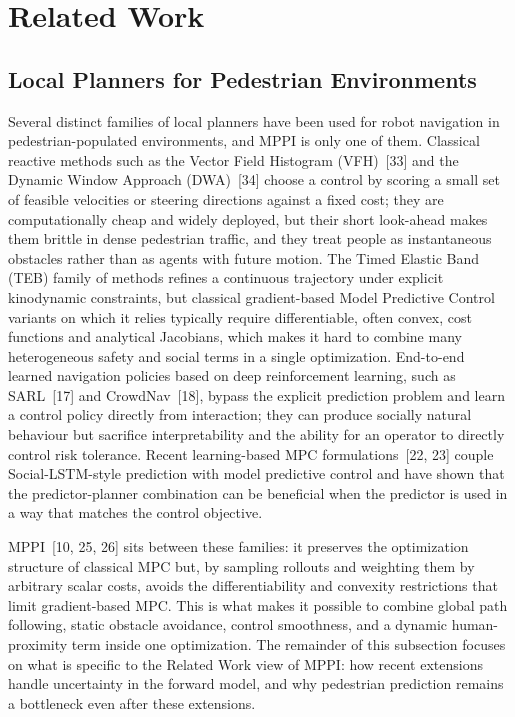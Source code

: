 \documentclass[12pt, a4paper]{article}
\begin{document}
\section{Related Work}
\label{sec:related}

\subsection{Local Planners for Pedestrian Environments}

Several distinct families of local planners have been used for robot navigation in pedestrian-populated environments, and MPPI is only one of them. Classical reactive methods such as the Vector Field Histogram (VFH)~[33] and the Dynamic Window Approach (DWA)~[34] choose a control by scoring a small set of feasible velocities or steering directions against a fixed cost; they are computationally cheap and widely deployed, but their short look-ahead makes them brittle in dense pedestrian traffic, and they treat people as instantaneous obstacles rather than as agents with future motion. The Timed Elastic Band (TEB) family of methods refines a continuous trajectory under explicit kinodynamic constraints, but classical gradient-based Model Predictive Control variants on which it relies typically require differentiable, often convex, cost functions and analytical Jacobians, which makes it hard to combine many heterogeneous safety and social terms in a single optimization. End-to-end learned navigation policies based on deep reinforcement learning, such as SARL~[17] and CrowdNav~[18], bypass the explicit prediction problem and learn a control policy directly from interaction; they can produce socially natural behaviour but sacrifice interpretability and the ability for an operator to directly control risk tolerance. Recent learning-based MPC formulations~[22, 23] couple Social-LSTM-style prediction with model predictive control and have shown that the predictor-planner combination can be beneficial when the predictor is used in a way that matches the control objective.

MPPI~[10, 25, 26] sits between these families: it preserves the optimization structure of classical MPC but, by sampling rollouts and weighting them by arbitrary scalar costs, avoids the differentiability and convexity restrictions that limit gradient-based MPC. This is what makes it possible to combine global path following, static obstacle avoidance, control smoothness, and a dynamic human-proximity term inside one optimization. The remainder of this subsection focuses on what is specific to the Related Work view of MPPI: how recent extensions handle uncertainty in the forward model, and why pedestrian prediction remains a bottleneck even after these extensions.
\end{document}

